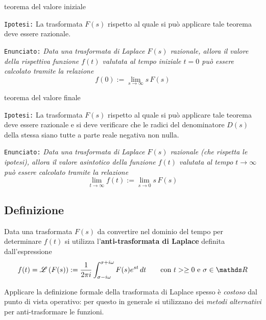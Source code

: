 		\begin{teorema}{teorema del valore iniziale} 
			
			\texttt{Ipotesi:} \label{teor:valiniziale} La trasformata $F(s)$ rispetto al quale si può applicare tale teorema deve essere razionale. \vspace{3mm}
			
			\texttt{Enunciato:} \textit{Data una trasformata di Laplace $F(s)$ razionale, allora il valore della rispettiva funzione $f(t)$ valutata al tempo iniziale $t = 0$ può essere calcolato tramite la relazione}
			\begin{equation}
				f(0) := \lim_{s\rightarrow \infty} s\,F(s)
			\end{equation}
		\end{teorema}
	
		\begin{teorema}{teorema del valore finale}
		
			\texttt{Ipotesi:}  \label{teor:valfinale} La trasformata $F(s)$ rispetto al quale si può applicare tale teorema deve essere razionale e si deve verificare che le radici del denominatore $D(s)$ della stessa siano tutte a parte reale negativa non nulla. \vspace{3mm}
			
			\texttt{Enunciato:} \textit{Data una trasformata di Laplace $F(s)$ razionale (che rispetta le ipotesi), allora il valore asintotico della funzione $f(t)$ valutata al tempo $t\rightarrow \infty$ può essere calcolato tramite la relazione}
			\begin{equation}
				\lim_{t\rightarrow \infty}f(t) := \lim_{s\rightarrow 0} s\,F(s)
			\end{equation}
		\end{teorema}
	
	\subsection{Definizione}
		\begin{concetto}
			Data una trasformata $F(s)$ da convertire nel dominio del tempo per determinare $f(t)$ si utilizza l'\textbf{anti-trasformata di Laplace} definita dall'espressione
			\begin{equation}
				f(t) = \trasf{F(s)} := \frac{1}{2\pi i} \int_{\sigma-i\omega}^{\sigma+i\omega} F(s) e^{st} \, dt \qquad \textrm{con $t>\geq 0$ e } \sigma \in \mathds R
			\end{equation}
		\end{concetto}
		Applicare la definizione formale della trasformata di Laplace spesso è \textit{costoso} dal punto di vista operativo: per questo in generale si utilizzano dei \textit{metodi alternativi} per anti-trasformare le funzioni.
		
